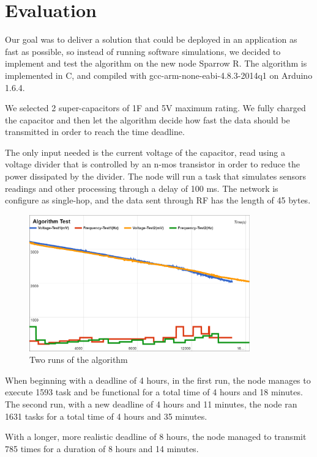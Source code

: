 \normalfont\normalsize
\chapter{Evaluation}

Our goal was to deliver a solution that could be deployed in an application as fast as possible, so
instead of running software simulations, we decided to implement and test the algorithm on the new
node Sparrow R. The algorithm is implemented in C, and compiled with gcc-arm-none-eabi-4.8.3-2014q1 on Arduino 1.6.4.

We selected 2 super-capacitors of 1F and 5V maximum rating. We fully charged the capacitor and then
let the algorithm decide how fast the data should be transmitted in order to reach the time
deadline.

The only input needed is the current voltage of the capacitor, read using a voltage divider that is
controlled by an n-mos transistor in order to reduce the power dissipated by the divider. The node
will run a task that simulates sensors readings and other processing through a delay of 100 ms. The
network is configure as single-hop, and the data sent through RF has the length of 45 bytes.

\begin{figure}[ht] \centering
\includegraphics[width=0.85\textwidth]{img/algtest.png}
\caption{Two runs of the algorithm}
\end{figure}

When beginning with a deadline of 4 hours, in the first run, the node manages to execute 1593 task and be
functional for a total time of 4 hours and 18 minutes. The second run, with a new deadline of 4
hours and 11 minutes, the node ran 1631 tasks for a total time of 4 hours and 35 minutes.

With a longer, more realistic deadline of 8 hours, the node managed to transmit 785 times for a
duration of 8 hours and 14 minutes.

